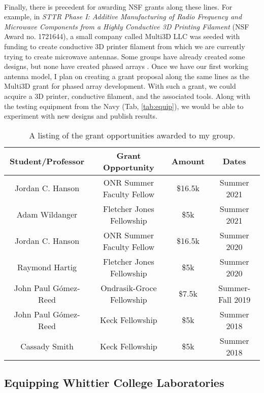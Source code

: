 \documentclass[../../../main.tex]{subfiles}
\begin{document}
\\
\vspace{0.25cm}
Finally, there is precedent for awarding NSF grants along these lines.  For example, in \textit{STTR Phase I: Additive Manufacturing of Radio Frequency and Microwave Components from a Highly Conductive 3D Printing Filament} (NSF Award no. 1721644), a small company called Multi3D LLC was seeded with funding to create conductive 3D printer filament from which we are currently trying to create microwave antennas.  Some groups have already created some designs, but none have created phased arrays \cite{10.1016/j.addma.2017.10.002} \cite{10.1049/iet-map.2017.0104}.  Once we have our first working antenna model, I plan on creating a grant proposal along the same lines as the Multi3D grant for phased array development.  With such a grant, we could acquire a 3D printer, conductive filament, and the associated tools.  Along with the testing equipment from the Navy (Tab, \ref{tab:equip}), we would be able to experiment with new designs and publish results.

\begin{table}
\centering
\begin{tabular}{c c c c}
Student/Professor & Grant Opportunity & Amount & Dates \\ \hline
Jordan C. Hanson & ONR Summer Faculty Fellow & \$16.5k & Summer 2021 \\
Adam Wildanger & Fletcher Jones Fellowship & \$5k & Summer 2021 \\
Jordan C. Hanson & ONR Summer Faculty Fellow & \$16.5k & Summer 2020 \\
Raymond Hartig & Fletcher Jones Fellowship & \$5k & Summer 2020 \\
John Paul G\'{o}mez-Reed & Ondrasik-Groce Fellowship & \$7.5k & Summer-Fall 2019 \\
John Paul G\'{o}mez-Reed & Keck Fellowship & \$5k & Summer 2018 \\
Cassady Smith & Keck Fellowship & \$5k & Summer 2018 \\
\end{tabular}
\caption{\label{tab:funds} A listing of the grant opportunities awarded to my group.}
\end{table}
 
\subsection{Equipping Whittier College Laboratories}
\end{document}
